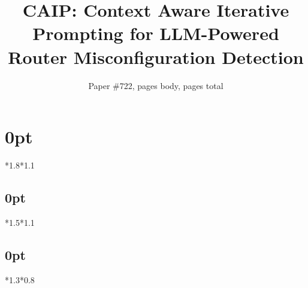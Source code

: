\usepackage{caption}
\usepackage{ltablex}

\usepackage{ifluatex}

\usepackage{outlines}
\newtheorem{insight}{Insight}

\captionsetup[figure]{belowskip=0pt}
\captionsetup[figure]{skip=0pt}
\captionsetup[table]{belowskip=0pt}
\captionsetup[table]{skip=0pt}


\usepackage[compact]{titlesec}
\renewcommand{\paragraph}[1]{\noindent\textbf{#1}}
\setlength{\textfloatsep}{5pt plus 0pt minus 2.0pt}
\titlespacing\section{0pt}{*1.8}{*1.1}
\titlespacing\subsection{0pt}{*1.5}{*1.1}
\titlespacing\subsection{0pt}{*1.3}{*0.8}
\usepackage{booktabs}



\newcommand*{\affmark}[1][*]{\textsuperscript{#1}}
\newcommand*{\affaddr}[1]{#1}

\title{CAIP: Context Aware Iterative Prompting for LLM-Powered Router Misconfiguration Detection}

\author{Paper \#722, \pageref{endOfBody} pages body, \pageref{LastPage} pages total}
\newcommand{\eg}{{\it e.g.}}
\newcommand{\ie}{{\it i.e.}}
\newcommand{\etal}{{\it et al.}}
\newcommand{\sysname}{{CAIP}}

\maketitle


\pagestyle{plain}

\begin{sloppypar}






\label{endOfBody}

 
\end{sloppypar}
\label{LastPage}

\pagebreak
